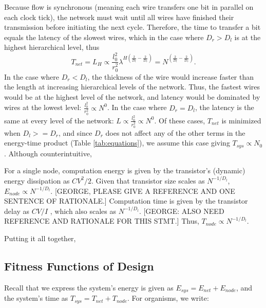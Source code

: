 \documentclass[12pt]{article}
\begin{document}
Because flow is synchronous (meaning each wire transfers one bit in parallel on each clock tick), the network 
must wait until all wires have finished their transmission before 
initiating the next cycle. Therefore, the time to transfer a bit 
equals the latency of the slowest wires, which in the case where $D_r > D_l$ is
at the highest hierarchical level, thus
\begin{equation}
T_{net} = L_H \propto \frac{l_0^2}{r_0^2} \lambda^{H\left( \frac{2}{D_l} - 
\frac{2}{D_r}\right)} = N^{\left( \frac{2}{D_l} - 
\frac{2}{D_r}\right)}.
\end{equation}
In the case where $D_r < D_l$, the thickness of the wire would increase faster than the length at increasing
hierarchical levels of the network.  Thus, the fastest wires would be at the highest level
of the network, and latency would be dominated by wires at the lowest level: $\frac{l_0^2}{r_0^2} \propto N^0$.  
In the case where $D_r = D_l$, the latency
is the same at every level of the network: $L \propto \frac{l_0^2}{r_0^2} \propto N^0$.
Of these cases, $T_{net}$ is minimized when $D_l >= D_r$,  and since $D_r$ does not affect any of the other terms in the energy-time product (Table \ref{tab:equations}),  we assume this case giving $T_{sys} \propto N_0$.  Although counterintuitive, 

For a single node, computation energy is given by the transistor's 
(dynamic) energy dissipation as $CV^2/2$.  Given that transistor size scales as $N^{-1/D_l}$,
$E_{node} \propto  N^{-1/D_l}$.  [GEORGE, PLEASE GIVE A REFERENCE AND ONE SENTENCE OF RATIONALE.]
Computation time is given by the 
transistor delay as $CV/I$ \cite{bakoglu90}, which also scales as $N^{-1/D_l}$.  [GEORGE: ALSO NEED REFERENCE AND RATIONALE FOR THIS STMT.]
Thus, $T_{node} \propto  N^{-1/D_l}$.  

Putting it all together, 


\subsection{Fitness Functions of Design}


Recall that we express the system's energy is given as $E_{sys} = E_{net} + E_{node}$, 
and the system's time as $T_{sys} = T_{net} + T_{node}$.  For 
organisms, we write:
\end{document}
